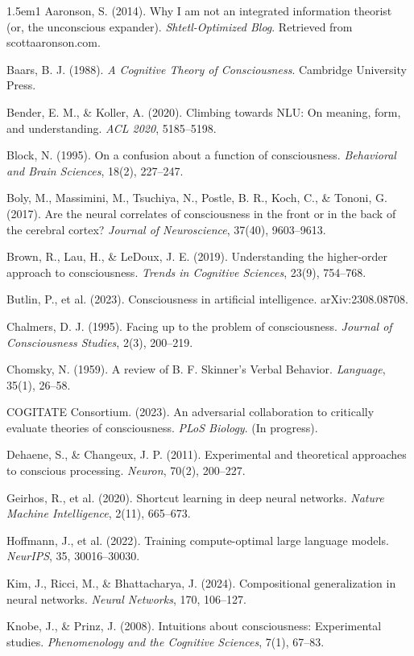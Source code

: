 \documentclass[12pt,a4paper]{article}
\begin{document}
\begin{hangparas}{1.5em}{1}
Aaronson, S. (2014). Why I am not an integrated information theorist (or, the unconscious expander). \textit{Shtetl-Optimized Blog}. Retrieved from scottaaronson.com.

Baars, B. J. (1988). \textit{A Cognitive Theory of Consciousness}. Cambridge University Press.

Bender, E. M., \& Koller, A. (2020). Climbing towards NLU: On meaning, form, and understanding. \textit{ACL 2020}, 5185--5198.

Block, N. (1995). On a confusion about a function of consciousness. \textit{Behavioral and Brain Sciences}, 18(2), 227--247.

Boly, M., Massimini, M., Tsuchiya, N., Postle, B. R., Koch, C., \& Tononi, G. (2017). Are the neural correlates of consciousness in the front or in the back of the cerebral cortex? \textit{Journal of Neuroscience}, 37(40), 9603--9613.

Brown, R., Lau, H., \& LeDoux, J. E. (2019). Understanding the higher-order approach to consciousness. \textit{Trends in Cognitive Sciences}, 23(9), 754--768.

Butlin, P., et al. (2023). Consciousness in artificial intelligence. arXiv:2308.08708.

Chalmers, D. J. (1995). Facing up to the problem of consciousness. \textit{Journal of Consciousness Studies}, 2(3), 200--219.

Chomsky, N. (1959). A review of B. F. Skinner's Verbal Behavior. \textit{Language}, 35(1), 26--58.

COGITATE Consortium. (2023). An adversarial collaboration to critically evaluate theories of consciousness. \textit{PLoS Biology}. (In progress).

Dehaene, S., \& Changeux, J. P. (2011). Experimental and theoretical approaches to conscious processing. \textit{Neuron}, 70(2), 200--227.

Geirhos, R., et al. (2020). Shortcut learning in deep neural networks. \textit{Nature Machine Intelligence}, 2(11), 665--673.

Hoffmann, J., et al. (2022). Training compute-optimal large language models. \textit{NeurIPS}, 35, 30016--30030.

Kim, J., Ricci, M., \& Bhattacharya, J. (2024). Compositional generalization in neural networks. \textit{Neural Networks}, 170, 106--127.

Knobe, J., \& Prinz, J. (2008). Intuitions about consciousness: Experimental studies. \textit{Phenomenology and the Cognitive Sciences}, 7(1), 67--83.


\end{hangparas}
\end{document}
